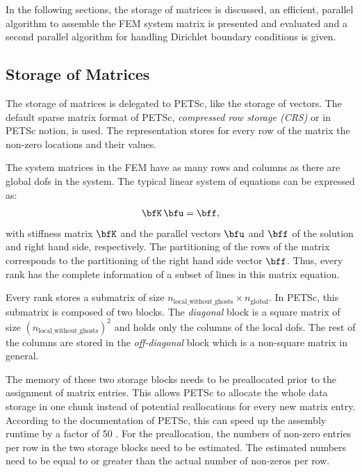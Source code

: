 In the following sections, the storage of matrices is discussed, an efficient, parallel algorithm to assemble the FEM system matrix is presented and evaluated and a second parallel algorithm for handling Dirichlet boundary conditions is given.

\subsection{Storage of Matrices}
The storage of matrices is delegated to PETSc, like the storage of vectors. The default sparse  matrix format of PETSc, \emph{compressed row storage (CRS)} or  in PETSc notion, is used. 
The representation stores for every row of the matrix the non-zero locations and their values.

The system matrices in the FEM have as many rows and columns as there are global dofs in the system. The typical linear system of equations can be expressed as:
\begin{align*}
  \bfK\,\bfu = \bff,
\end{align*}
with stiffness matrix $\bfK$ and the parallel vectors $\bfu$ and $\bff$ of the solution and right hand side, respectively. The partitioning of the rows of the matrix corresponds to the partitioning of the right hand side vector $\bff$. Thus, every rank has the complete information of a subset of lines in this matrix equation.

Every rank stores a submatrix of size $n_\text{local\_without\_ghosts} \times n_\text{global}$. In PETSc, this submatrix is composed of two blocks. The \emph{diagonal} block is a square matrix of size $(n_\text{local\_without\_ghosts})^2$ and holds only the columns of the local dofs. The rest of the columns are stored in the \emph{off-diagonal} block which is a non-square matrix in general.

The memory of these two storage blocks needs to be preallocated prior to the assignment of matrix entries. This allows PETSc to allocate the whole data storage in one chunk instead of potential reallocations for every new matrix entry. According to the documentation of PETSc, this can speed up the assembly runtime by a factor of 50 \cite{petsc-web-page}. For the preallocation, the numbers of non-zero entries per row in the two storage blocks need to be estimated. The estimated numbers need to be equal to or greater than the actual number of non-zeros per row.

